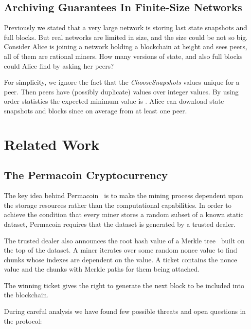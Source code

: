 \documentclass[conference,compsoc]{IEEEtran}
\begin{document}
\subsection{Archiving Guarantees In Finite-Size Networks}

Previously we stated that a very large network is storing last  state snapshots and full blocks. But real networks are limited in size, and the size could be not so big. Consider Alice is joining a network holding a blockchain at height  and sees  peers, all of them are rational miners. How many versions of state, and also full blocks could Alice find by asking her peers? 

For simplicity, we ignore the fact that the \textit{ChooseSnapshots} values unique for a peer. Then  peers have  (possibly duplicate) values over  integer values. By using order statistics the expected minimum value is . Alice can download state snapshots and blocks since  on average from at least one peer.


\section{Related Work}

\subsection{The Permacoin Cryptocurrency}

The key idea behind Permacoin~\cite{miller2014permacoin} is to make the mining process dependent upon the storage resources rather than the computational capabilities. In order to achieve the condition that every miner stores a random subset of a known static dataset, Permacoin requires that the dataset is generated by a trusted dealer. 

The trusted dealer also announces the root hash value of a Merkle tree~\cite{merkle1987digital} built on the top of the dataset. A miner iterates over some random nonce value to find chunks whose indexes are dependent on the value. A ticket contains the nonce value and the chunks with Merkle paths for them being attached. 

The winning ticket gives the right to generate the next block  to be included into the blockchain.

During careful analysis we have found few possible threats and open questions in the protocol:
\end{document}
